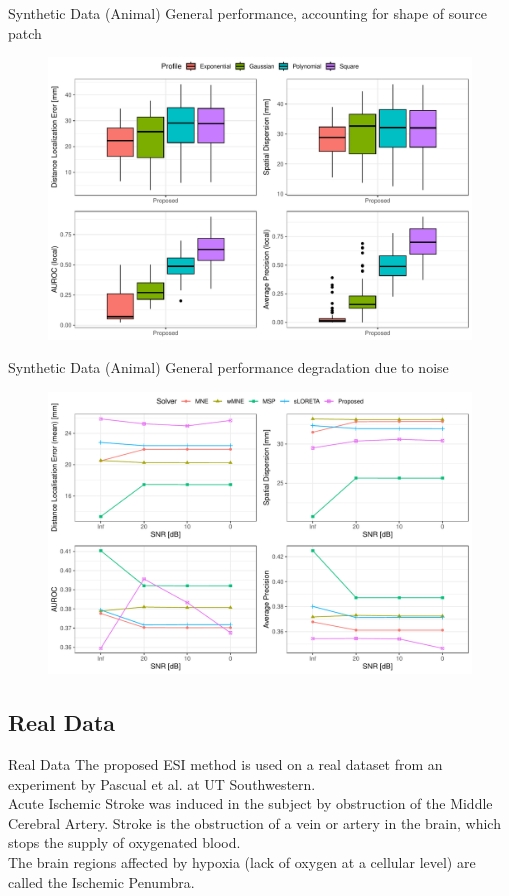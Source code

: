 \documentclass[progressbar=head]{beamer}
\begin{document}
\begin{frame}{Synthetic Data (Animal)}
General performance, accounting for shape of source patch
\begin{figure}
    \centering
    \includegraphics[width=0.7\linewidth]{img_stats/pig_shape_EvalMetrics_Protocol04_vol5k_pigALL.pdf}
\end{figure}
\end{frame}

\begin{frame}{Synthetic Data (Animal)}
General performance degradation due to noise
\begin{figure}
    \centering
    \includegraphics[width=0.7\linewidth]{img_stats/pig_SNRdegradation_EvalMetrics_protocol04_vol5k_pig.pdf}
\end{figure}
\end{frame}

{
\subsection{Real Data}
}

\begin{frame}{Real Data}
The proposed ESI method is used on a real dataset from an experiment by Pascual et al.  at UT Southwestern.\\

Acute Ischemic Stroke was induced in the subject by obstruction of the Middle
Cerebral Artery. Stroke is the obstruction of a vein or artery in the
brain, which stops the supply of oxygenated blood.\\

 The brain regions affected by
hypoxia (lack of oxygen at a cellular level) are called the Ischemic Penumbra.
\end{frame}
\end{document}
